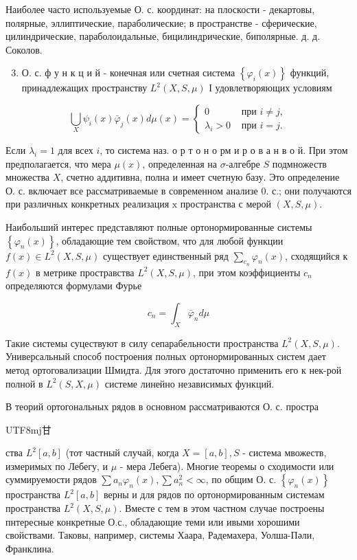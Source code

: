 \documentclass[10pt]{article}
\begin{document}
Наиболее часто используемые О. с. координат: на плоскости - декартовы, полярные, эллиптические, параболические; в пространстве - сферические, цилиндрические, параболоидальные, бицилиндрические, биполярные. д. д. Соколов.

\begin{enumerate}
  \setcounter{enumi}{2}
  \item О. с. ф у н к ц и й - конечная или счетная система $\left\{\varphi_{i}(x)\right\}$ функций, принадлежащих пространству $L^{2}(X, S, \mu)$ І удовлетворяющих условиям
\end{enumerate}

\[
\bigcup_{X} \psi_{i}(x) \bar{\varphi}_{j}(x) d \mu(x)=\left\{\begin{array}{lr}
0 & \text { при } i \neq j, \\
\lambda_{i}>0 & \text { при } i=j .
\end{array}\right.
\]

Если $\lambda_{i}=1$ для всех $i$, то система наз. о р т о н о рм и р о в а н в о й. При этом предполагается, что мера $\mu(x)$, определенная на $\sigma$-алгебре $S$ подмножеств множества $X$, счетно аддитивна, полна и имеет счетную базу. Это определение О. с. включает все рассматриваемые в современном анализе 0. с.; они получаются при различных конкретных реализация $\mathrm{x}$ пространства с мерой $(X, S, \mu)$.

Наибольший интерес представляют полные ортонормированные системы $\left\{\varphi_{n}(x)\right\}$, обладающие тем свойством, что для любой функции $f(x) \in L^{2}(X, S, \mu)$ существует единственный ряд $\sum_{c_{n}} \varphi_{n}(x)$, сходящийся к $f(x)$ в метрике простравства $L^{2}(X, S, \mu)$, при этом коэффициенты $c_{n}$ определяются формулами Фурье

\[
c_{n}=\int_{X} \bar{\varphi}_{n} d \mu
\]

Такие системы суцествуют в силу сепарабельности пространства $L^{2}(X, S, \mu)$. Универсальный способ построения полных ортонормированных систем дает метод ортоговализации Шмидта. Для этого достаточно применить его к нек-рой полной в $L^{2}(S, X, \mu)$ системе линейно независимых функций.

В теорий ортогональных рядов в основном рассматриваются О. с. простра\begin{CJK}{UTF8}{mj}甘\end{CJK}ства $L^{2}[a, b]$ (тот частный случай, когда $X=[a, b], S$ - система мвожеств, измеримых по Лебегу, и $\mu$ - мера Лебега). Многие теоремы о сходимости или суммируемости рядов $\sum a_{n} \varphi_{n}(x), \sum a_{n}^{2}<\infty$, по общим О. с. $\left\{\varphi_{n}(x)\right\}$ пространства $L^{2}[a, b]$ верны и для рядов по ортонормированным системам пространства $L^{2}(X, S, \mu)$. Вместе с тем в этом частном случае построены пнтересные конкретные О.с., обладающие теми или ивыми хорошими свойствами. Таковы, например, системы Хаара, Радемахера, Уолша-Пәли, Франклина.
\end{document}
